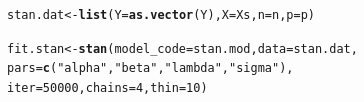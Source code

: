 \documentclass{beamer}\usepackage[]{graphicx}\usepackage[]{color}
\makeatletter
\newcommand{\hlnum}[1]{\textcolor[rgb]{0.686,0.059,0.569}{#1}}%
\newcommand{\hlstr}[1]{\textcolor[rgb]{0.192,0.494,0.8}{#1}}%
\newcommand{\hlstd}[1]{\textcolor[rgb]{0.345,0.345,0.345}{#1}}%
\newcommand{\hlkwb}[1]{\textcolor[rgb]{0.69,0.353,0.396}{#1}}%
\newcommand{\hlkwc}[1]{\textcolor[rgb]{0.333,0.667,0.333}{#1}}%
\newcommand{\hlkwd}[1]{\textcolor[rgb]{0.737,0.353,0.396}{\textbf{#1}}}%
\newenvironment{kframe}{%
 \def\at@end@of@kframe{}%
 \ifinner\ifhmode%
  \def\at@end@of@kframe{\end{minipage}}%
  \begin{minipage}{\columnwidth}%
 \fi\fi%
 \def\FrameCommand##1{\hskip\@totalleftmargin \hskip-\fboxsep
 \colorbox{shadecolor}{##1}\hskip-\fboxsep
     \hskip-\linewidth \hskip-\@totalleftmargin \hskip\columnwidth}%
 \MakeFramed {\advance\hsize-\width
   \@totalleftmargin\z@ \linewidth\hsize
   \@setminipage}}%
 {\par\unskip\endMakeFramed%
 \at@end@of@kframe}
\newenvironment{knitrout}{}{} %
\makeatother
\begin{document}
\newsavebox{\standata}
\begin{lrbox}{\standata}
\begin{knitrout}\small
{}\color{fgcolor}\begin{kframe}
\begin{alltt}
\hlstd{stan.dat} \hlkwb{<-} \hlkwd{list}\hlstd{(}\hlkwc{Y} \hlstd{=} \hlkwd{as.vector}\hlstd{(Y),} \hlkwc{X} \hlstd{= Xs,} \hlkwc{n} \hlstd{= n,} \hlkwc{p} \hlstd{= p)}
\end{alltt}
\end{kframe}
\end{knitrout}
\end{lrbox}

\newsavebox{\stansamp}
\begin{lrbox}{\stansamp}
\begin{knitrout}\small
{}\color{fgcolor}\begin{kframe}
\begin{alltt}
\hlstd{fit.stan} \hlkwb{<-} \hlkwd{stan}\hlstd{(}\hlkwc{model_code} \hlstd{= stan.mod,} \hlkwc{data} \hlstd{= stan.dat,}
                 \hlkwc{pars} \hlstd{=} \hlkwd{c}\hlstd{(}\hlstr{"alpha"}\hlstd{,} \hlstr{"beta"}\hlstd{,} \hlstr{"lambda"}\hlstd{,} \hlstr{"sigma"}\hlstd{),}
                 \hlkwc{iter} \hlstd{=} \hlnum{50000}\hlstd{,} \hlkwc{chains} \hlstd{=} \hlnum{4}\hlstd{,} \hlkwc{thin} \hlstd{=} \hlnum{10}\hlstd{)}
\end{alltt}
\end{kframe}
\end{knitrout}
\end{lrbox}
\end{document}
